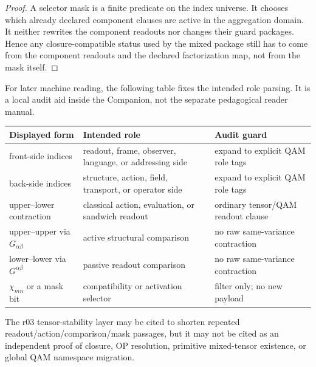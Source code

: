 \begin{proof}
A selector mask is a finite predicate on the index universe.  It chooses which already declared component clauses are active in the aggregation domain.  It neither rewrites the component readouts nor changes their guard packages.  Hence any closure-compatible status used by the mixed package still has to come from the component readouts and the declared factorization map, not from the mask itself.
\end{proof}

\begin{remark}\label{rem:r03-llm-audit-role-table}
For later machine reading, the following table fixes the intended role parsing.  It is a local audit aid inside the Companion, not the separate pedagogical reader manual.
\begin{center}
\renewcommand{\arraystretch}{1.12}
\begin{tabular}{|p{}|p{}|p{}|}
\hline
\textbf{Displayed form} & \textbf{Intended role} & \textbf{Audit guard} \\
\hline
front-side indices & readout, frame, observer, language, or addressing side & expand to explicit QAM role tags \\
\hline
back-side indices & structure, action, field, transport, or operator side & expand to explicit QAM role tags \\
\hline
upper--lower contraction & classical action, evaluation, or sandwich readout & ordinary tensor/QAM readout clause \\
\hline
upper--upper via \(G_{\alpha\beta}\) & active structural comparison & no raw same-variance contraction \\
\hline
lower--lower via \(G^{\alpha\beta}\) & passive readout comparison & no raw same-variance contraction \\
\hline
\(\chi_{mn}\) or a mask bit & compatibility or activation selector & filter only; no new payload \\
\hline
\end{tabular}
\end{center}
\end{remark}

\begin{corollary}\label{cor:r03-proof-neutrality-of-tensor-layer}
The r03 tensor-stability layer may be cited to shorten repeated readout/action/comparison/mask passages, but it may not be cited as an independent proof of closure, OP resolution, primitive mixed-tensor existence, or global QAM namespace migration.
\end{corollary}

